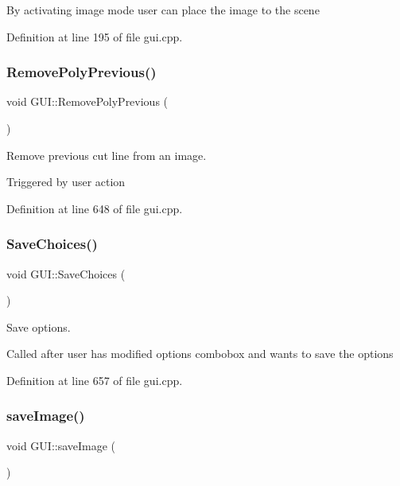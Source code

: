 By activating image mode user can place the image to the scene 

Definition at line 195 of file gui.\+cpp.

\mbox{\label{classGUI_abf8e1050ae4d599bf35af7b1f841d960}} 
\subsubsection{\texorpdfstring{Remove\+Poly\+Previous()}{RemovePolyPrevious()}}
{\footnotesize\ttfamily void G\+U\+I\+::\+Remove\+Poly\+Previous (\begin{DoxyParamCaption}{ }\end{DoxyParamCaption})}



Remove previous cut line from an image. 

Triggered by user action 

Definition at line 648 of file gui.\+cpp.

\mbox{\label{classGUI_a00fb847ea0a8249acaaf70c0f3ba3fd4}} 
\subsubsection{\texorpdfstring{Save\+Choices()}{SaveChoices()}}
{\footnotesize\ttfamily void G\+U\+I\+::\+Save\+Choices (\begin{DoxyParamCaption}{ }\end{DoxyParamCaption})}



Save options. 

Called after user has modified options combobox and wants to save the options 

Definition at line 657 of file gui.\+cpp.

\mbox{\label{classGUI_a44684af7706c021022520e2c4829c3ee}} 
\subsubsection{\texorpdfstring{save\+Image()}{saveImage()}}
{\footnotesize\ttfamily void G\+U\+I\+::save\+Image (\begin{DoxyParamCaption}{ }\end{DoxyParamCaption})}



